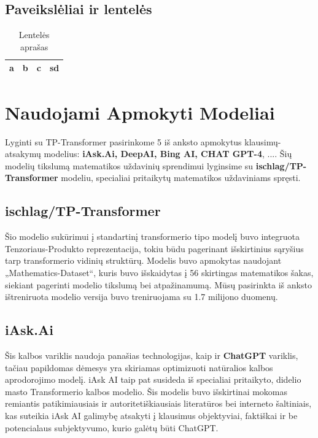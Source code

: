 \documentclass[conference]{IEEEtran}
\begin{document}
\subsection{Paveikslėliai ir lentelės}



\begin{table}[htbp]
\caption{Lentelės aprašas}
\begin{center}
\begin{tabular}{|c|c|c|c|}
\hline
a & b & c & sd \\
\hline
\end{tabular}
\label{tab1}
\end{center}
\end{table}



\section{Naudojami Apmokyti Modeliai}
Lyginti su TP-Transformer pasirinkome 5 iš anksto apmokytus klausimų-atsakymų modelius: \textbf{
iAsk.Ai, DeepAI, Bing AI, CHAT GPT-4}, .... Šių modelių tikslumą matematikos uždavinių sprendimui lyginsime su \textbf{ischlag/TP-Transformer} modeliu,
specialiai pritaikytų matematikos uždaviniams spręsti.

\subsection{ischlag/TP-Transformer}
Šio modelio sukūrimui į standartinį transformerio tipo modelį buvo integruota Tenzoriaus-Produkto
reprezentacija, tokiu būdu pagerinant išskirtinius sąryšius tarp transformerio vidinių struktūrų. Modelis buvo apmokytas
naudojant „Mathematics-Dataset“, kuris buvo išskaidytas į 56 skirtingas matematikos šakas, siekiant
pagerinti modelio tikslumą bei atpažinamumą. Mūsų pasirinkta iš anksto ištreniruota modelio 
versija buvo treniruojama su 1.7 milijono duomenų.

\subsection{iAsk.Ai}
Šis kalbos variklis naudoja panašias technologijas, kaip ir \textbf{ChatGPT} variklis, tačiau
papildomas dėmesys yra skiriamas optimizuoti natūralios kalbos aprodorojimo modelį. iAsk AI taip pat susideda iš specialiai pritaikyto,
didelio masto Transformerio kalbos modelio. Šis modelis buvo išskirtinai mokomas remiantis
patikimiausiais ir autoritetiškiausiais literatūros bei interneto šaltiniais,
kas suteikia iAsk AI galimybę atsakyti į klausimus objektyviai,
faktiškai ir be potencialaus subjektyvumo, kurio galėtų būti ChatGPT.
\end{document}
